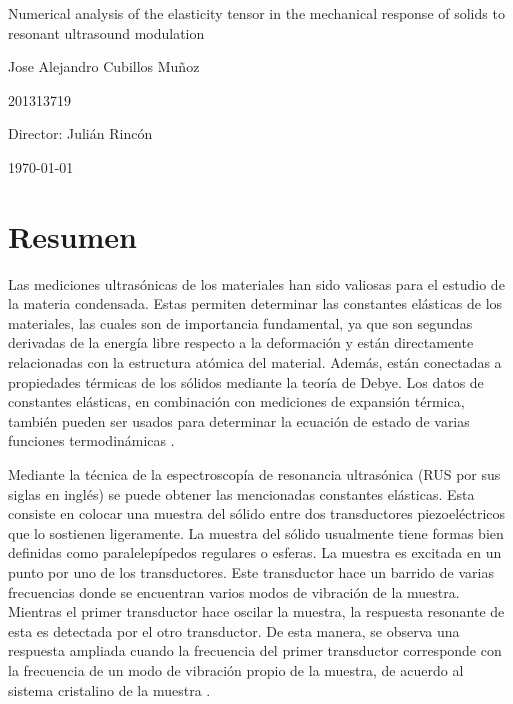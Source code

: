 \documentclass[12pt]{article}
\begin{document}
\begin{center}
\Huge
Numerical analysis of the elasticity tensor in the mechanical response of solids to resonant ultrasound modulation

\vspace{3mm}
\Large Jose Alejandro Cubillos Muñoz

\large
201313719


\vspace{2mm}
\Large
Director: Julián Rincón

\normalsize
\vspace{2mm}

\today
\end{center}


\normalsize

\section{Resumen}

Las mediciones ultrasónicas de los materiales han sido valiosas para el estudio de la materia condensada. Estas permiten determinar las constantes elásticas de los materiales, las cuales son de importancia fundamental, ya que son segundas derivadas de la energía libre respecto a la deformación y están directamente relacionadas con la estructura atómica del material. Además, están conectadas a propiedades térmicas de los sólidos mediante la teoría de Debye. Los datos de constantes elásticas, en combinación con mediciones de expansión térmica, también pueden ser usados para determinar la ecuación de estado de varias funciones termodinámicas \cite{Leisure_1997}.


Mediante la técnica de la espectroscopía de resonancia ultrasónica (RUS por sus siglas en inglés) se puede obtener las mencionadas constantes elásticas. Esta consiste en colocar una muestra del sólido entre dos transductores piezoeléctricos que lo sostienen ligeramente. La muestra del sólido usualmente tiene formas bien definidas como paralelepípedos regulares o esferas. La muestra es excitada en un punto por uno de los transductores. Este transductor hace un barrido de varias frecuencias donde se encuentran varios modos de vibración de la muestra. Mientras el primer transductor hace oscilar la muestra, la respuesta resonante de esta es detectada por el otro transductor. De esta manera, se observa una respuesta ampliada cuando la frecuencia del primer transductor corresponde con la frecuencia de un modo de vibración propio de la muestra, de acuerdo al sistema cristalino de la muestra \cite{Leisure_1997}. 
\end{document}
